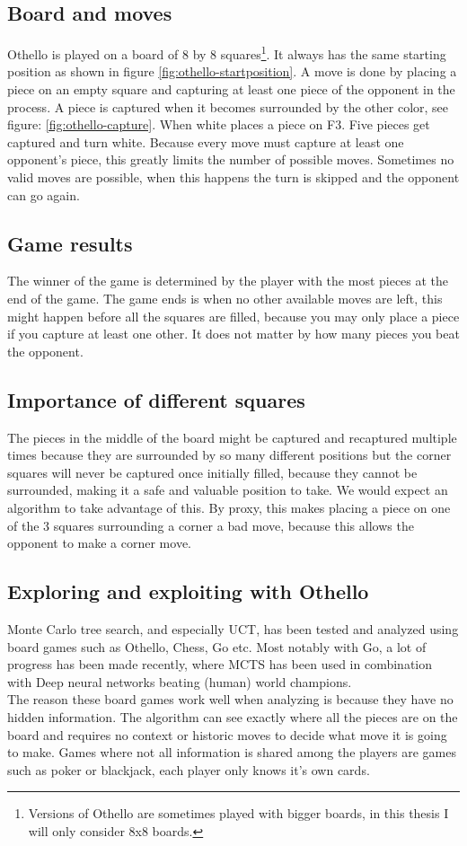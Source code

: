 \documentclass[11pt,a4paper]{article}
\begin{document}
\subsection{Board and moves}
Othello is played on a board of 8 by 8 squares\footnote{Versions of Othello are sometimes played with bigger boards, in this thesis I will only consider 8x8 boards.}. It always has the same starting position as shown in figure \ref{fig:othello-startposition}. A move is done by placing a piece on an empty square and capturing at least one piece of the opponent in the process. A piece is captured when it becomes surrounded by the other color, see figure: \ref{fig:othello-capture}. When white places a piece on F3. Five pieces get captured and turn white. Because every move must capture at least one opponent's piece, this greatly limits the number of possible moves. Sometimes no valid moves are possible, when this happens the turn is skipped and the opponent can go again.
\subsection{Game results} The winner of the game is determined by the player with the most pieces at the end of the game. The game ends is when no other available moves are left, this might happen before all the squares are filled, because you may only place a piece if you capture at least one other. It does not matter by how many pieces you beat the opponent.
\subsection{Importance of different squares} The pieces in the middle of the board might be captured and recaptured multiple times because they are surrounded by so many different positions but the corner squares will never be captured once initially filled, because they cannot be surrounded, making it a safe and valuable position to take. We would expect an algorithm to take advantage of this. By proxy, this makes placing a piece on one of the 3 squares surrounding a corner a bad move, because this allows the opponent to make a corner move.

\subsection{Exploring and exploiting with Othello}
Monte Carlo tree search, and especially UCT, has been tested and analyzed using board games such as Othello, Chess, Go etc. Most notably with Go, a lot of progress has been made recently, where MCTS has been used in combination with Deep neural networks beating (human) world champions\cite{deepmind}.\\
The reason these board games work well when analyzing is because they have no hidden information. The algorithm can see exactly where all the pieces are on the board and requires no context or historic moves to decide what move it is going to make. Games where not all information is shared among the players are games such as poker or blackjack, each player only knows it's own cards.\\
\end{document}
